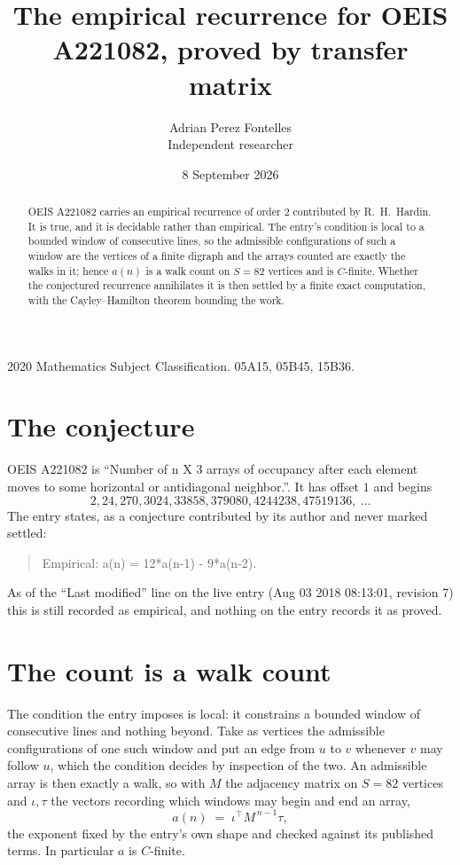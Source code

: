 \documentclass[11pt,a4paper]{article}
\title{The empirical recurrence for OEIS A221082, proved by transfer matrix}
\author{Adrian Perez Fontelles\\ \small Independent researcher}
\date{8 September 2026}
\theoremstyle{plain}
\theoremstyle{definition}
\begin{document}
\maketitle

\begin{abstract}
OEIS A221082 carries an empirical recurrence of order $2$ contributed by R.~H.~Hardin. It is
true, and it is decidable rather than empirical. The entry's condition is local to a bounded window of consecutive lines, so
the admissible configurations of such a window are the vertices of a finite digraph and the
arrays counted are exactly the walks in it; hence $a(n)$ is a walk count on $S=82$ vertices
and is $C$-finite. Whether the conjectured recurrence annihilates it is then settled by a
finite exact computation, with the Cayley--Hamilton theorem bounding the work.
\end{abstract}

\noindent\small 2020 Mathematics Subject Classification. 05A15, 05B45, 15B36.\normalsize

\section{The conjecture}

OEIS A221082 is ``Number of n X 3 arrays of occupancy after each element moves to some horizontal or antidiagonal neighbor.''. It has offset $1$ and begins
\[
2, 24, 270, 3024, 33858, 379080, 4244238, 47519136,\ \dots
\]
The entry states, as a conjecture contributed by its author and never marked settled:
\begin{quote}
Empirical: a(n) = 12*a(n-1) - 9*a(n-2).
\end{quote}
As of the ``Last modified'' line on the live entry (Aug 03 2018 08:13:01, revision 7) this is still
recorded as empirical, and nothing on the entry records it as proved.

\section{The count is a walk count}

The condition the entry imposes is local: it constrains a bounded window of consecutive lines and nothing beyond. Take as
vertices the admissible configurations of one such window and put an edge from $u$ to $v$
whenever $v$ may follow $u$, which the condition decides by inspection of the two. An
admissible array is then exactly a walk, so with $M$ the adjacency matrix on $S=82$ vertices
and $\iota,\tau$ the vectors recording which windows may begin and end an array,
\[
a(n)\;=\;\iota^{\!\top}M^{\,n-1}\tau ,
\]
the exponent fixed by the entry's own shape and checked against its published terms. In
particular $a$ is $C$-finite.
\end{document}
